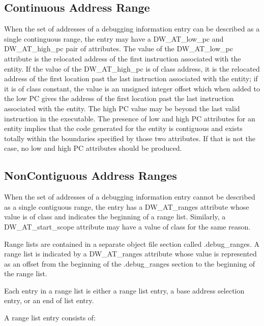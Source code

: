 \subsection{Continuous Address Range}
\label{chap:contiguousaddressranges}
When the set of addresses of a debugging information entry can
be described as a single continguous range, the entry may have
a DW\_AT\_low\_pc and DW\_AT\_high\_pc pair of attributes. The value
of the DW\_AT\_low\_pc attribute is the relocated address of the
first instruction associated with the entity. If the value of
the DW\_AT\_high\_pc is of class address, it is the relocated
address of the first location past the last instruction
associated with the entity; if it is of class constant, the
value is an unsigned integer offset which when added to the
low PC gives the address of the first location past the last
instruction associated with the entity.  The high PC value
may be beyond the last valid instruction in the executable.
The presence of low and high PC attributes for an entity
implies that the code generated for the entity is contiguous
and exists totally within the boundaries specified by those
two attributes. If that is not the case, no low and high PC
attributes should be produced.

\subsection{Non\dash Contiguous Address Ranges}
\label{chap:noncontiguousaddressranges}
When the set of addresses of a debugging information entry
cannot be described as a single contiguous range, the entry has
a DW\_AT\_ranges attribute whose value is of class 
and indicates the beginning of a range list. Similarly,
a DW\_AT\_start\_scope attribute may have a value of class
 for the same reason.  

Range lists are contained
in a separate object file section called .debug\_ranges. A
range list is indicated by a DW\_AT\_ranges attribute whose
value is represented as an offset from the beginning of the
.debug\_ranges section to the beginning of the range list.

Each entry in a range list is either a range list entry,
a base address selection entry, or an end of list entry.

A range list entry consists of:

